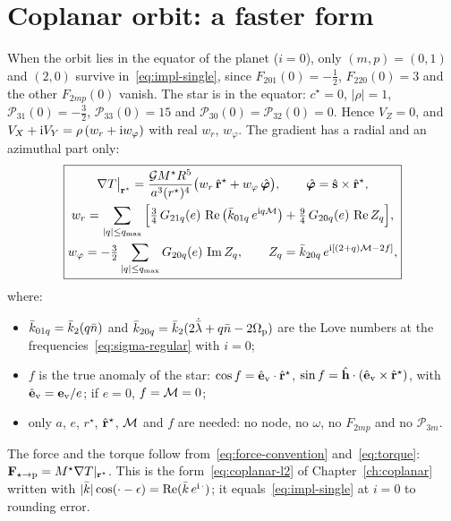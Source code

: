 \section{Coplanar orbit: a faster form}\label{sec:coplanar-nbody}
When the orbit lies in the equator of the planet ($i=0$), only $(m,p)=(0,1)$ and $(2,0)$ survive in~\eqref{eq:impl-single}, since $F_{201}(0)=-\tfrac12$, $F_{220}(0)=3$ and the other $F_{2mp}(0)$ vanish. The star is in the equator: $c^\star=0$, $|\rho|=1$, $\mathcal P_{31}(0)=-\tfrac32$, $\mathcal P_{33}(0)=15$ and $\mathcal P_{30}(0)=\mathcal P_{32}(0)=0$. Hence $V_Z=0$, and $V_X+\mathrm{i} V_Y=\rho\,(w_r+\mathrm{i} w_\varphi)$ with real $w_r$, $w_\varphi$. The gradient has a radial and an azimuthal part only:
\begin{equation}
\boxed{\begin{gathered}
  \nabla T\big|_{\mathbf r^\star}=\frac{\mathcal{G} M^\star R^5}{a^3(r^\star)^4}\big(w_r\,\hat{\mathbf r}^\star+w_\varphi\,\hat{\boldsymbol\varphi}\big),\qquad \hat{\boldsymbol\varphi}=\hat{\mathbf s}\times\hat{\mathbf r}^\star,\\
  w_r=\sum_{|q|\le q_{\max}}\Big[\tfrac34\,G_{21q}(e)\,\operatorname{Re}\big(\bar k_{01q}\,e^{\mathrm{i} q\mathcal{M}}\big)+\tfrac94\,G_{20q}(e)\,\operatorname{Re} Z_q\Big],\\
  w_\varphi=-\tfrac32\sum_{|q|\le q_{\max}}G_{20q}(e)\,\operatorname{Im} Z_q,\qquad Z_q=\bar k_{20q}\,e^{\mathrm{i}[(2+q)\mathcal{M}-2f]},
\end{gathered}} \label{eq:coplanar-nbody}
\end{equation}
where:
\begin{itemize}
  \item $\bar k_{01q}=\bar k_2(q\bar n)$ and $\bar k_{20q}=\bar k_2(2\dot{\bar\lambda}+q\bar n-2\Omega_{\mathrm p})$ are the Love numbers at the frequencies~\eqref{eq:sigma-regular} with $i=0$;
  \item $f$ is the true anomaly of the star: $\cos f=\hat{\mathbf e}_{\rm v}\cdot\hat{\mathbf r}^\star$, $\sin f=\hat{\mathbf h}\cdot(\hat{\mathbf e}_{\rm v}\times\hat{\mathbf r}^\star)$, with $\hat{\mathbf e}_{\rm v}=\mathbf e_{\rm v}/e$; if $e=0$, $f=\mathcal{M}=0$;
  \item only $a$, $e$, $r^\star$, $\hat{\mathbf r}^\star$, $\mathcal{M}$ and $f$ are needed: no node, no $\omega$, no $F_{2mp}$ and no $\mathcal P_{3m}$.
\end{itemize}
The force and the torque follow from~\eqref{eq:force-convention} and~\eqref{eq:torque}: $\mathbf F_{\star\to\mathrm p}=M^\star\nabla T|_{\mathbf r^\star}$. This is the form~\eqref{eq:coplanar-l2} of Chapter~\ref{ch:coplanar} written with $|\bar k|\cos(\cdot-\epsilon)=\operatorname{Re}(\bar k\,e^{\mathrm{i}\,\cdot})$; it equals~\eqref{eq:impl-single} at $i=0$ to rounding error.


